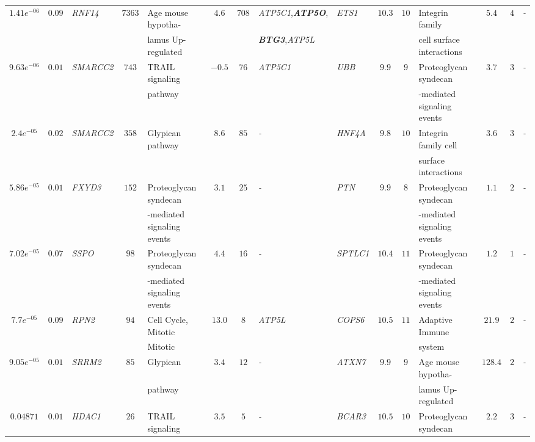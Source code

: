 \documentclass[10pt]{article}
\begin{document}
{\begin{landscape}
\begin{table}[!htbp]
{\begin{tabular}{c c l c l c c l |l c c l c c l}
$1.41e^{-06}$ & $0.09$ & \textit{RNF14} & $7363$ & Age mouse hypotha- & $4.6$ & $708$&\textit{ATP5C1},\textbf{\textit{ATP5O}}, & \textit{ETS1} & $10.3$ & $10$ & Integrin family  & $5.4$ & $4$ & \textit{-} \tabularnewline

&&&& lamus Up-regulated &&& \textbf{\textit{BTG3}},\textit{ATP5L} &&&&cell surface interactions &&&\tabularnewline

$9.63e^{-06}$ & $0.01$ & \textit{SMARCC2} & $743$ & TRAIL signaling & $-0.5$ & $76$ & \textit{ATP5C1} & \textit{UBB} & $9.9$ & $9$ & Proteoglycan syndecan & $3.7$ & $3$ & \textit{-} \tabularnewline

&&&& pathway &&&&&&& -mediated signaling events &&&\tabularnewline

$2.4e^{-05}$ & $0.02$ & \textit{SMARCC2} & $358$ & Glypican pathway & $8.6$ & $85$ & \textit{-} & \textit{HNF4A} & $9.8$ & $10$ & Integrin family cell & $3.6$ & $3$ & \textit{-} \tabularnewline 

&&&&  &&&&&&& surface interactions &&& \\[2pt]\hline\hline

$5.86e^{-05}$ & $0.01$ & \textit{FXYD3} & $152$ & Proteoglycan syndecan & $3.1$ & $25$&\textit{-} & \textit{PTN} & $9.9$ & $8$ & Proteoglycan syndecan & $1.1$ & $2$ & \textit{-} \tabularnewline

&&&& -mediated signaling events  &&&&&&& -mediated signaling events &&&\tabularnewline

$7.02e^{-05}$ & $0.07$ & \textit{SSPO} & $98$ & Proteoglycan syndecan & $4.4$ & $16$&\textit{-} & \textit{SPTLC1} & $10.4$ & $11$ & Proteoglycan syndecan & $1.2$ & $1$ & \textit{-} \tabularnewline

&&&&  -mediated signaling events &&&&&&&-mediated signaling events &&&\tabularnewline


$7.7e^{-05}$ & $0.09$ & \textit{RPN2} & $94$ & Cell Cycle, Mitotic & $13.0$ & $8$&\textit{ATP5L} & \textit{COPS6} & $10.5$ & $11$ & Adaptive Immune & $21.9$ & $2$ & \textit{-} \tabularnewline

&&&&  Mitotic &&&&&&&system &&&\tabularnewline

$9.05e^{-05}$ & $0.01$ & \textit{SRRM2} & $85$ & Glypican & $3.4$ & $12$&\textit{-} & \textit{ATXN7} & $9.9$ & $9$ & Age mouse hypotha- & $128.4$ & $2$ & \textit{-} \tabularnewline

&&&& pathway &&&&&&& lamus Up-regulated &&&\tabularnewline

$0.04871$ & $0.01$ & \textit{HDAC1} & $26$ & TRAIL signaling & $3.5$ & $5$&\textit{-} & \textit{BCAR3} & $10.5$ & $10$ & Proteoglycan syndecan & $2.2$ & $3$ & \textit{-} \tabularnewline


\end{tabular}}
\end{table}
\end{landscape}}
\end{document}
